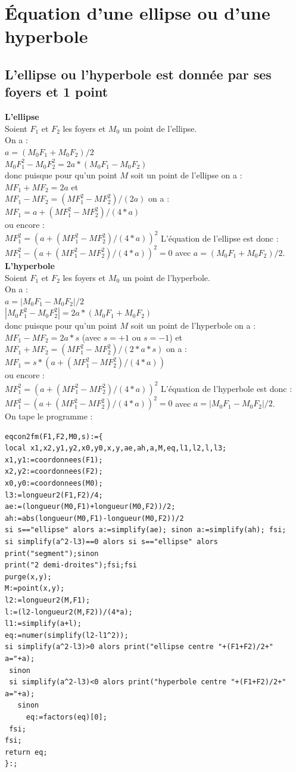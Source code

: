 \documentclass[a4paper,11pt]{book}
\begin{document}
\section{\'Equation d'une ellipse ou d'une hyperbole}
\subsection{L'ellipse ou l'hyperbole est donn\'ee par ses foyers et 1 point}
{\bf L'ellipse}\\
Soient $F_1$ et $F_2$ les foyers et $M_0$ un point de l'ellipse.\\
On a :\\
$a=(M_0F_1+M_0F_2)/2$\\
$M_0F_1^2-M_0F_2^2=2a*(M_0F_1-M_0F_2)$\\
donc puisque pour qu'un point $M$ soit un point de l'ellipse on a : 
$MF_1+MF_2=2a$ et \\
$MF_1-MF_2=(MF_1^2-MF_2^2)/(2a)$ on a :\\
$MF_1=a+(MF_1^2-MF_2^2)/(4*a)$\\
ou encore :\\
$MF_1^2=(a+(MF_1^2-MF_2^2)/(4*a))^2$
L'\'equation de l'ellipse est donc :
$MF_1^2-(a+(MF_1^2-MF_2^2)/(4*a))^2=0$ avec $a=(M_0F_1+M_0F_2)/2$.\\
{\bf L'hyperbole}\\
Soient $F_1$ et $F_2$ les foyers et $M_0$ un point de l'hyperbole.\\ 
On a :\\
$a=|M_0F_1-M_0F_2|/2$\\
$|M_0F_1^2-M_0F_2^2|=2a*(M_0F_1+M_0F_2)$\\
donc puisque pour qu'un point $M$ soit un point de l'hyperbole on a : 
$MF_1-MF_2=2a*s$ (avec $s=+1$ ou $s=-1$) et \\
$MF_1+MF_2=(MF_1^2-MF_2^2)/(2*a*s)$ on a :\\
$MF_1=s*(a+(MF_1^2-MF_2^2)/(4*a))$\\
ou encore :\\
$MF_1^2=(a+(MF_1^2-MF_2^2)/(4*a))^2$
L'\'equation de l'hyperbole est donc :
$MF_1^2-(a+(MF_1^2-MF_2^2)/(4*a))^2=0$ avec $a=|M_0F_1-M_0F_2|/2$.\\
On tape le programme :\\
\begin{verbatim}
eqcon2fm(F1,F2,M0,s):={
local x1,x2,y1,y2,x0,y0,x,y,ae,ah,a,M,eq,l1,l2,l,l3;
x1,y1:=coordonnees(F1);
x2,y2:=coordonnees(F2);
x0,y0:=coordonnees(M0);
l3:=longueur2(F1,F2)/4;
ae:=(longueur(M0,F1)+longueur(M0,F2))/2;
ah:=abs(longueur(M0,F1)-longueur(M0,F2))/2
si s=="ellipse" alors a:=simplify(ae); sinon a:=simplify(ah); fsi;
si simplify(a^2-l3)==0 alors si s=="ellipse" alors print("segment");sinon 
print("2 demi-droites");fsi;fsi
purge(x,y);
M:=point(x,y);
l2:=longueur2(M,F1);
l:=(l2-longueur2(M,F2))/(4*a);
l1:=simplify(a+l);
eq:=numer(simplify(l2-l1^2));
si simplify(a^2-l3)>0 alors print("ellipse centre "+(F1+F2)/2+" a="+a);
 sinon 
 si simplify(a^2-l3)<0 alors print("hyperbole centre "+(F1+F2)/2+" a="+a); 
   sinon
     eq:=factors(eq)[0];
 fsi;
fsi;
return eq;
}:;
\end{verbatim}
\end{document}
